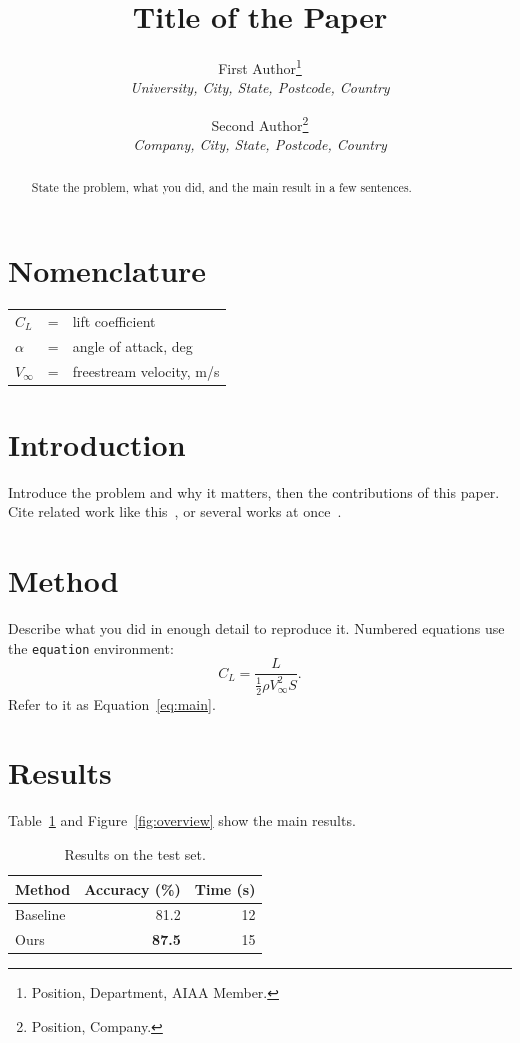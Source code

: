\documentclass{aiaa-tc}
\title{Title of the Paper}
\author{First Author\thanks{Position, Department, AIAA Member.}\\
  {\normalsize\itshape University, City, State, Postcode, Country}\\
  \and
  Second Author\thanks{Position, Company.}\\
  {\normalsize\itshape Company, City, State, Postcode, Country}}
\begin{document}
\maketitle

\begin{abstract}
State the problem, what you did, and the main result in a few sentences.
\end{abstract}

\section*{Nomenclature}
\begin{tabular}{@{}lcl@{}}
$C_L$ & = & lift coefficient \\
$\alpha$ & = & angle of attack, deg \\
$V_\infty$ & = & freestream velocity, m/s \\
\end{tabular}

\section{Introduction}
\label{sec:intro}
Introduce the problem and why it matters, then the contributions of this
paper. Cite related work like this~\cite{anderson2010}, or several works at
once~\cite{anderson2010,zienkiewicz2005}.

\section{Method}
\label{sec:method}
Describe what you did in enough detail to reproduce it. Numbered equations use
the \texttt{equation} environment:
\begin{equation}
  \label{eq:main}
  C_L = \frac{L}{\tfrac{1}{2} \rho V_\infty^2 S}.
\end{equation}
Refer to it as Equation~\eqref{eq:main}.

\section{Results}
\label{sec:results}
Table~\ref{tab:results} and Figure~\ref{fig:overview} show the main results.

\begin{table}[htbp]
  \centering
  \caption{Results on the test set.}
  \label{tab:results}
  \begin{tabular}{lrr}
    \toprule
    Method & Accuracy (\%) & Time (s) \\
    \midrule
    Baseline & 81.2 & 12 \\
    Ours & \textbf{87.5} & 15 \\
    \bottomrule
  \end{tabular}
\end{table}
\end{document}
